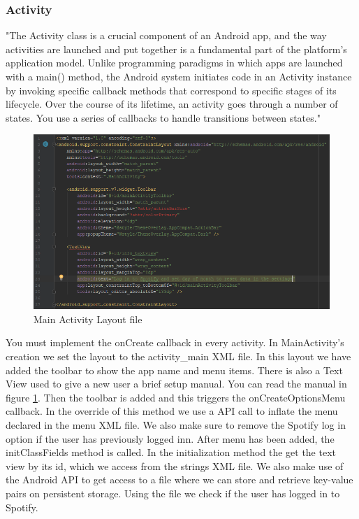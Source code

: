 \subsubsection{Activity}
"The Activity class is a crucial component of an Android app, and the way activities are launched and put together is a fundamental part of the platform's application model. Unlike programming paradigms in which apps are launched with a main() method, the Android system initiates code in an Activity instance by invoking specific callback methods that correspond to specific stages of its lifecycle. Over the course of its lifetime, an activity goes through a number of states. You use a series of callbacks to handle transitions between states."\cite{activity} 


\begin{figure}
	\centering
	\includegraphics[width=1\linewidth]{Figures/activity_main}
	\caption{Main Activity Layout file}
	\label{fig:activitymain}
\end{figure}


You must implement the onCreate callback in every activity. In MainActivity's creation we set the layout to the activity\_main XML file. In this layout we have added the toolbar to show the app name and menu items. There is also a Text View used to give a new user a brief setup manual. You can read the manual in figure \ref{fig:activitymain}. Then the toolbar is added and this triggers the onCreateOptionsMenu callback. In the override of this method we use a API call to inflate the menu declared in the menu XML file. We also make sure to remove the Spotify log in option if the user has previously logged inn. After menu has been added, the initClassFields method is called. In the initialization method the get the text view by its id, which we access from the strings XML file. We also make use of the Android API to get access to a file where we can store and retrieve key-value pairs on persistent storage. Using the file we check if the user has logged in to Spotify.

